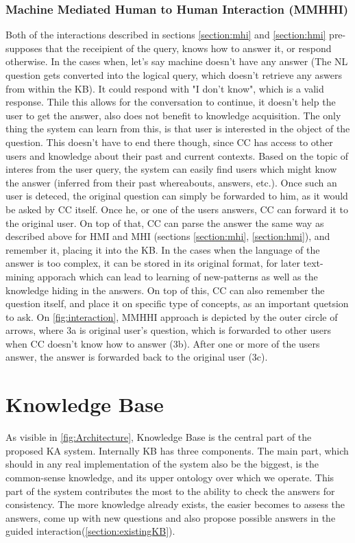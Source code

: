 \subsubsection{Machine Mediated Human to Human Interaction (MMHHI)}
\label{section:mmhhi}
Both of the interactions described in sections \ref{section:mhi} and 
\ref{section:hmi} pre-supposes that the receipient of the query, knows how to
answer it, or respond otherwise. In the cases when, let's say machine doesn't
have any answer (The NL question gets converted into the logical query, which doesn't retrieve any aswers from within the KB). It could respond with 
"I don't know", which is a valid response.
Thile this allows for the conversation to continue, it doesn't help the user
to get the answer, also does not benefit to knowledge acquisition. The only 
thing the system can learn from this, is that user is interested in the object
of the question. This doesn't have to end there though, since CC has access to
other users and knowledge about their past and current contexts. Based on the
topic of interes from the user query, the system can easily find users which
might know the answer (inferred from their past whereabouts, answers, etc.).
Once such an user is deteced, the original question can simply be forwarded to
him, as it would be asked by CC itself. Once he, or one of the users answers,
CC can forward it to the original user. On top of that, CC can parse the answer
the same way as described above for HMI and MHI (sections \ref{section:mhi},
\ref{section:hmi}), and remember it, placing it into the KB. In the cases when
the language of the answer is too complex, it can be stored in its original
format, for later text-mining apporach which can lead to learning of new-patterns
as well as the knowledge hiding in the answers. On top of this, CC can also
remember the question itself, and place it on specific type of concepts, as an
important quetsion to ask. On \autoref{fig:interaction},
MMHHI approach is depicted by the outer circle of arrows, where 3a is original 
user's question, which is forwarded to other users when CC doesn't know how to 
answer (3b). After one or more of the users answer, the answer is forwarded back
to the original user (3c).

\section{Knowledge Base}
\label{section:kb}
As visible in \autoref{fig:Architecture}, Knowledge Base is the central part
of the proposed KA system. Internally KB has three components. The main part, 
which should in any real implementation of the system also be the biggest, is 
the common-sense knowledge, and its upper ontology over which we operate. 
This part of the system contributes the most to the ability to check the 
answers for consistency. The more knowledge already exists, the easier becomes 
to assess the answers, come up with new questions and also propose possible
answers in the guided interaction(\autoref{section:existingKB}).

